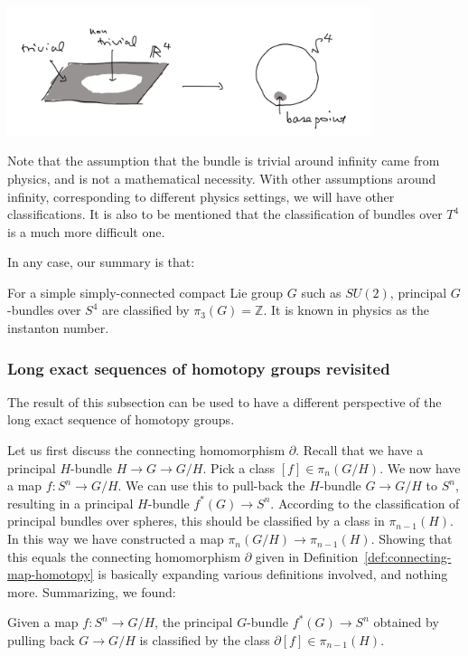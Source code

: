 \documentclass[12pt]{article}
\numberwithin{equation}{section}
\numberwithin{figure}{section}
\theoremstyle{remark}
\renewenvironment{figure}[1][]{
  \begin{originalfigure}[#1]
    \begin{mdframed}[linecolor=black!0,backgroundcolor=black!1]
}{
    \end{mdframed}
  \end{originalfigure}
}
\def\bR{\mathbb{R}}
\def\bZ{\mathbb{Z}}
\begin{document}
\begin{figure}[h]
  \centering
  \includegraphics[width=0.8\textwidth]{bundle-R4.png}
  \caption{Principal bundle over $\bR^4$ with a trivialization around infinity
  is given by a pull-back from $S^4$}
  \label{fig:bundle-R4}
\end{figure}

Note that the assumption that the bundle is trivial around infinity 
came from physics, and is not a mathematical necessity.
With other assumptions around infinity,
corresponding to different physics settings,
we will have other classifications.
It is also to be mentioned that the classification of bundles over $T^4$ 
is a much more difficult one.

In any case, our summary is that:
\begin{example}
For a simple simply-connected compact Lie group $G$ such as $SU(2)$,
principal $G$-bundles over $S^4$ are classified by 
$\pi_3(G)=\bZ$.
It is known in physics as the instanton number.
\end{example}

\subsubsection{Long exact sequences of homotopy groups revisited}
\label{sec:long-exact-and-bundles}
The result of this subsection can be used to have 
a different perspective 
of the long exact sequence of homotopy groups.

Let us first discuss the connecting homomorphism $\partial$.
Recall that we have a principal $H$-bundle $H\to G\to G/H$.
Pick a class $[f]\in \pi_{n}(G/H)$.
We now have a map $f:S^{n}\to G/H$.
We can use this to pull-back the $H$-bundle $G\to G/H$ to $S^n$,
resulting in a principal $H$-bundle $f^*(G)\to S^n$.
According to the classification of principal bundles over spheres,
this should be classified by a class in $ \pi_{n-1}(H)$.
In this way we have constructed a map 
$\pi_{n}(G/H)\to \pi_{n-1}(H)$.
Showing that this equals the connecting homomorphism $\partial$
given in Definition~\ref{def:connecting-map-homotopy} 
is basically expanding various definitions involved, and
nothing more.
Summarizing, we found:
\begin{proposition}
\label{prop:connecting-and-bundle}
  Given a map $f:S^{n}\to G/H$,
  the principal $G$-bundle $f^*(G)\to S^n$ 
  obtained by pulling back $G\to G/H$
  is classified by 
  the class $\partial[f]\in \pi_{n-1}(H)$.
\end{proposition}
\end{document}
